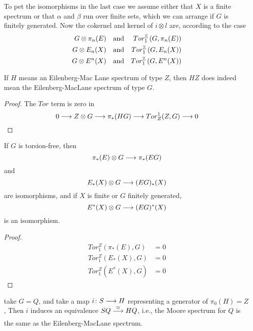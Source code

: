 \documentclass[../main]{subfiles}
\begin{document}
To pet the isomorphisms in the last case we assume either that $X$ is a finite spectrum or that $\alpha$ and $\beta$ run over finite sets, which we can arrange if $G$ is finitely generated. Now the cokernel and kernel of $i\otimes l$ are, according to the case
\begin{align}
    G\otimes \pi_n(E) && \text{and} && Tor_1^{\mathbb{Z}} \left( G, \pi_n(E) \right) \nonumber \\
    G\otimes E_n(X) && \text{and} && Tor_1^{\mathbb{Z}} \left( G, E_n(X) \right) \nonumber \\
    G\otimes E^n(X) && \text{and} && Tor_1^{\mathbb{Z}} \left( G, E^n(X) \right) \nonumber
\end{align}

\begin{example}
If $H$ means an Eilenberg-Mac Lane spectrum of type $Z$, then $HZ$ does indeed mean the Eilenberg-MacLane spectrum of type $G$.
\end{example}

\begin{proof}
The $Tor$ term is zero in
\[0\longrightarrow Z\otimes G\longrightarrow \pi_\ast(HG)\longrightarrow Tor_Z^1(Z, G)\longrightarrow 0\]
\end{proof}


\begin{proposition}\label{prop:p3c06.7}
If $G$ is torsion-free, then
\[\pi_\ast (E)\otimes G\longrightarrow \pi_\ast(EG)\]
and
\[E_\ast(X)\otimes G\longrightarrow (EG)_\ast(X)\]
are isomorphisms, and if $X$ is finite or $G$ finitely generated,
\[E^\ast(X)\otimes G\longrightarrow (EG)^\ast (X)\]
is an isomorphism.
\end{proposition}

\begin{proof}
\begin{align}
    Tor_1^Z(\pi_\ast(E), G) &= 0 \nonumber \\
    Tor_1^Z(E_\ast(X), G) &= 0 \nonumber \\
    Tor_1^Z(E^\ast(X), G) &= 0 \nonumber
\end{align}
\end{proof}

\begin{example}
take $G=Q$, and take a map $i\colon S \longrightarrow H$ representing a generator of $\pi_0(H)=Z$, Then $i$ induces an equivalence $SQ\vra{\simeq}HQ$, i.e., the Moore spectrum for $Q$ is the same as the Eilenberg-MacLane spectrum.
\end{example}
\end{document}
